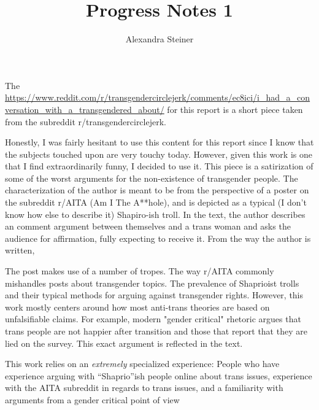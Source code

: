 \documentclass{article}
\title{Progress Notes 1}
\author{Alexandra Steiner}
\begin{document}
\maketitle

The \href{text referenced}{https://www.reddit.com/r/transgendercirclejerk/comments/ec8ici/i\_had\_a\_conversation\_with\_a\_transgendered\_about/} for this report is a short piece taken from the subreddit r/transgendercirclejerk. \linebreak{}

Honestly, I was fairly hesitant to use this content for this report since I know that the subjects touched upon are very touchy today. However, given this work is one that I find extraordinarily funny, I decided to use it. This piece is a satirization of some of the worst arguments for the non-existence of transgender people. The characterization of the author is meant to be from the perspective of a poster on the subreddit r/AITA (Am I The A**hole), and is depicted as a typical (I don't know how else to describe it) Shapiro-ish troll. In the text, the author describes an comment argument between themselves and a trans woman and asks the audience for affirmation, fully expecting to receive it. From the way the author is written, 

The post makes use of a number of tropes. The way r/AITA commonly mishandles posts about transgender topics. The prevalence of Shaprioist trolls and their typical methods for arguing against transgender rights. However, this work mostly centers around how most anti-trans theories are based on unfalsifiable claims. For example, modern "gender critical" rhetoric argues that trans people are not happier after transition and those that report that they are lied on the survey. This exact argument is reflected in the text.

This work relies on an \emph{extremely} specialized experience: People who have experience arguing with “Shaprio”ish people online about trans issues, experience with the AITA subreddit in regards to trans issues, and a familiarity with arguments from a gender critical point of view
\end{document}
